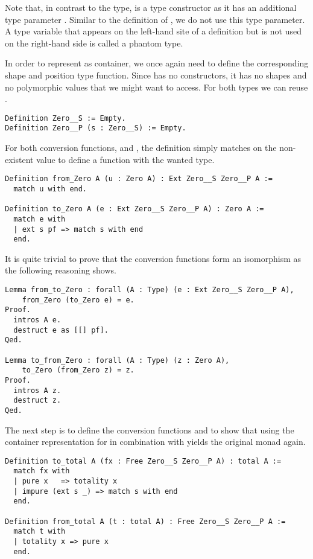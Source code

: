 Note that, in contrast to the  type,  is a type
constructor as it has an additional type parameter .
Similar to the definition of , we do not use this type
parameter.
A type variable that appears on the left-hand site of a definition but
is not used on the right-hand side is called a phantom type.

In order to represent  as container, we once again need to
define the corresponding shape and position type function.
Since  has no constructors, it has no shapes and no
polymorphic values that we might want to access.
For both types we can reuse .

\begin{verbatim}
Definition Zero__S := Empty.
Definition Zero__P (s : Zero__S) := Empty.
\end{verbatim}

For both conversion functions,  and ,
the definition simply matches on the non-existent value to define a
function with the wanted type.

\begin{verbatim}
Definition from_Zero A (u : Zero A) : Ext Zero__S Zero__P A :=
  match u with end.

Definition to_Zero A (e : Ext Zero__S Zero__P A) : Zero A :=
  match e with
  | ext s pf => match s with end
  end.
\end{verbatim}

It is quite trivial to prove that the conversion functions form an
isomorphism as the following reasoning shows.

\begin{verbatim}
Lemma from_to_Zero : forall (A : Type) (e : Ext Zero__S Zero__P A),
    from_Zero (to_Zero e) = e.
Proof.
  intros A e.
  destruct e as [[] pf].
Qed.

Lemma to_from_Zero : forall (A : Type) (z : Zero A),
    to_Zero (from_Zero z) = z.
Proof.
  intros A z.
  destruct z.
Qed.
\end{verbatim}

The next step is to define the conversion functions 
and  to show that using
the container representation for  in combination with
 yields the original monad  again.

\begin{verbatim}
Definition to_total A (fx : Free Zero__S Zero__P A) : total A :=
  match fx with
  | pure x   => totality x
  | impure (ext s _) => match s with end
  end.

Definition from_total A (t : total A) : Free Zero__S Zero__P A :=
  match t with
  | totality x => pure x
  end.
\end{verbatim}

